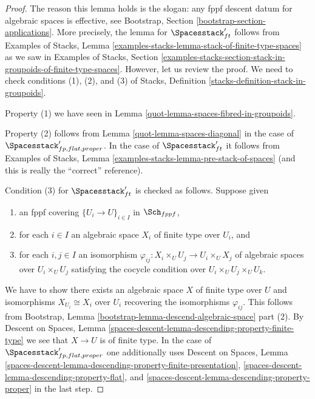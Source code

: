 \begin{proof}

The reason this lemma holds is the slogan: any fppf descent datum for algebraic
spaces is effective, see Bootstrap, Section
\ref{bootstrap-section-applications}.
More precisely, the lemma for $\Spacesstack'_{ft}$ follows from
Examples of Stacks, Lemma
\ref{examples-stacks-lemma-stack-of-finite-type-spaces}
as we saw in Examples of Stacks, Section
\ref{examples-stacks-section-stack-in-groupoids-of-finite-type-spaces}.
However, let us review the proof. We need to check conditions
(1), (2), and (3) of Stacks, Definition
\ref{stacks-definition-stack-in-groupoids}.

\medskip\noindent
Property (1) we have seen in Lemma \ref{quot-lemma-spaces-fibred-in-groupoids}.

\medskip\noindent
Property (2) follows from
Lemma \ref{quot-lemma-spaces-diagonal} in the case of
$\Spacesstack'_{fp, flat, proper}$.
In the case of $\Spacesstack'_{ft}$ it follows
from Examples of Stacks, Lemma
\ref{examples-stacks-lemma-pre-stack-of-spaces}
(and this is really the ``correct'' reference).

\medskip\noindent
Condition (3) for $\Spacesstack'_{ft}$ is checked as follows. Suppose given
\begin{enumerate}
\item an fppf covering $\{U_i \to U\}_{i \in I}$ in $\Sch_{fppf}$,
\item for each $i \in I$ an algebraic space $X_i$ of finite type over
$U_i$, and
\item for each $i, j \in I$ an isomorphism
$\varphi_{ij} : X_i \times_U U_j \to U_i \times_U X_j$ of algebraic spaces
over $U_i \times_U U_j$ satisfying the cocycle condition over
$U_i \times_U U_j \times_U U_k$.
\end{enumerate}
We have to show there exists an algebraic space $X$ of finite type over $U$
and isomorphisms $X_{U_i} \cong X_i$ over $U_i$ recovering the
isomorphisms $\varphi_{ij}$. This follows from
Bootstrap, Lemma \ref{bootstrap-lemma-descend-algebraic-space} part (2).
By Descent on Spaces, Lemma
\ref{spaces-descent-lemma-descending-property-finite-type}
we see that $X \to U$ is of finite type.
In the case of $\Spacesstack'_{fp, flat, proper}$
one additionally uses
Descent on Spaces, Lemma
\ref{spaces-descent-lemma-descending-property-finite-presentation},
\ref{spaces-descent-lemma-descending-property-flat}, and
\ref{spaces-descent-lemma-descending-property-proper}
in the last step.
\end{proof}

